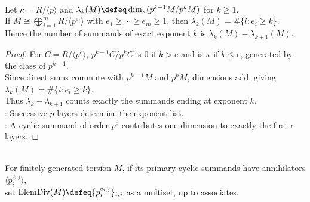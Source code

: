 \begin{proposition} \label{prop:p-primary-layer-counts-recover-exponents} \\
Let $\kappa=R/\langle p\rangle$ and $\lambda_k(M)\defeq\dim_{\kappa}(p^{k-1}M/p^kM)$ for $k\geq1$.\\
If $M\cong\bigoplus\limits_{i=1}^mR/\langle p^{e_i}\rangle$ with $e_1\geq\cdots\geq e_m\geq1$, then $\lambda_k(M)=\#\{i:e_i\geq k\}$.\\
Hence the number of summands of exact exponent $k$ is $\lambda_k(M)-\lambda_{k+1}(M)$.
\begin{proof} For $C=R/\langle p^e\rangle$, $p^{k-1}C/p^kC$ is $0$ if $k>e$ and is $\kappa$ if $k\leq e$, generated by the class of $p^{k-1}$.\\
Since direct sums commute with $p^{k-1}M$ and $p^kM$, dimensions add, giving $\lambda_k(M)=\#\{i:e_i\geq k\}$.\\
Thus $\lambda_k-\lambda_{k+1}$ counts exactly the summands ending at exponent $k$.\\
: Successive $p$-layers determine the exponent list.\\
: A cyclic summand of order $p^e$ contributes one dimension to exactly the first $e$ layers.
\end{proof}
\end{proposition}

\begin{definition} \label{def:elementary-divisors-pid-module} \\
For finitely generated torsion $M$, if its primary cyclic summands have annihilators
$\langle p_i^{e_{i,j}}\rangle$,\\
set $\operatorname{ElemDiv}(M)\defeq\{p_i^{e_{i,j}}\}_{i,j}$ as a multiset, up to associates.
\end{definition}

